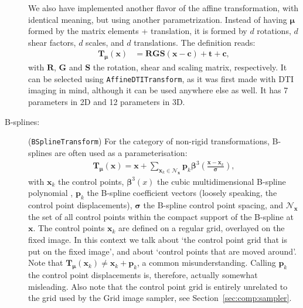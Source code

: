\documentclass[]{report}
\newcommand{\vx}{\bm{x}}
\newcommand{\vmu}{\bm{\mu}}
\newcommand{\vTm}{\bm{T}_{\vmu}}
\newcommand{\vTmx}{\bm{T}_{\vmu}(\bm{x})}
\newcommand{\Ncal}{\mathcal{N}}
\begin{document}
\begin{description}
We also have implemented another flavor of the affine
transformation, with identical meaning, but using another
parametrization. Instead of having $\vmu$ formed by the matrix
elements + translation, it is formed by $d$ rotations, $d$ shear
factors, $d$ scales, and $d$ translations. The definition reads:
\begin{align}
\vTmx &= \bm{R} \bm{G} \bm{S} (\vx - \bm{c}) + \bm{t} + \bm{c},
\end{align}
with $\bm{R}$, $\bm{G}$ and $\bm{S}$ the rotation, shear and scaling
matrix, respectively. It can be selected using
\texttt{AffineDTITransform}, as it was first made with DTI imaging
in mind, although it can be used anywhere else as well. It has 7
parameters in 2D and 12 parameters in 3D.

\item[B-splines:] (\texttt{BSplineTransform}) For the category of non-rigid
    transformations, B-splines \citep{RueckertEA99} are often used as a
    parameterisation:
\begin{align}
\vTmx = \vx + \sum_{\vx_k \in \Ncal_{\vx}} \bm{p}_k
\bm{\beta}^3\left( \frac{\vx - \vx_k}{\bm{\sigma}}
\right),\label{eq:bspline}
\end{align}
with $\vx_k$ the control points, $\bm{\beta}^3(x)$ the cubic
multidimensional B-spline polynomial \citep{Unser99}, $\bm{p}_k$ the
B-spline coefficient vectors (loosely speaking, the control point
displacements), $\bm{\sigma}$ the B-spline control point spacing, and
$\Ncal_{\vx}$ the set of all control points within the compact support of
the B-spline at $\vx$. The control points $\vx_k$ are defined on a regular
grid, overlayed on the fixed image. In this context we talk about `the
control point grid that is put on the fixed image', and about `control
points that are moved around'. Note that $\vTm(\vx_k)\neq \vx_k +
\bm{p}_k$, a common misunderstanding. Calling $\bm{p}_k$ the control point
displacements is, therefore, actually somewhat misleading. Also note that
the control point grid is entirely unrelated to the grid used by the Grid
image sampler, see Section~\ref{sec:comp:sampler}.


\end{description}
\end{document}
